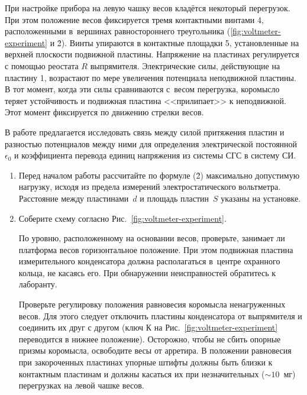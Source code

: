 При настройке прибора на левую чашку весов кладётся некоторый перегрузок. При этом положение весов фиксируется тремя
контактными винтами 4, расположенными в~вершинах равностороннего треугольника (\ref{fig:voltmeter-experiment} и \r{2}). Винты упираются в
контактные площадки 5, установленные на верхней плоскости подвижной пластины. Напряжение на пластинах регулируется с
помощью реостата $R$ выпрямителя. Электрические силы, действующие на пластину 1, возрастают по мере увеличения
потенциала неподвижной пластины. В тот момент, когда эти силы сравниваются с~весом перегрузка, коромысло теряет
устойчивость и подвижная пластина <<прилипает>> к неподвижной. Этот момент фиксируется по движению стрелки весов.

\begin{lab:task}
	
	В работе предлагается исследовать связь между силой  притяжения пластин и разностью потенциалов между ними для
	определения электрической постоянной $\epsilon_0$ и коэффициента перевода единиц напряжения из системы СГС в систему СИ.
	
	
	\begin{enumerate}
		\item Перед началом работы рассчитайте по формуле (\r{2}) максимально допустимую нагрузку, исходя из предела измерений
		электростатического вольтметра. Расстояние между пластинами~$d$ и площадь пластин~$S$ указаны на установке.
		
		\item Соберите схему согласно Рис.~\ref{fig:voltmeter-experiment}.
		
		По уровню, расположенному на основании весов, проверьте, занимает ли платформа весов горизонтальное положение. При этом
		подвижная пластина измерительного конденсатора должна располагаться в~центре охранного кольца, не касаясь его. При
		обнаружении неисправностей обратитесь к лаборанту.
		
		Проверьте регулировку положения равновесия коромысла ненагруженных весов. Для этого следует отключить пластины
		конденсатора от выпрямителя и соединить их друг с другом (ключ К на Рис.~\ref{fig:voltmeter-experiment} переводится в нижнее положение). Осторожно,
		чтобы не сбить опорные призмы коромысла, освободите весы от арретира. В положении равновесия при закороченных пластинах
		упорные штифты должны быть близки к контактным пластинам и должны касаться их при незначительных ($\sim 10$~мг)
		перегрузках на левой чашке весов.
		

\end{enumerate}
\end{lab:task}
